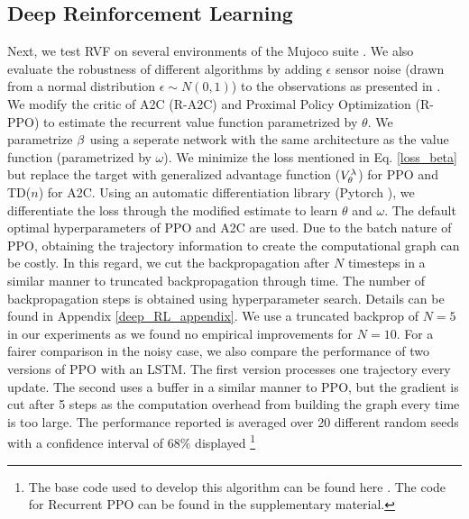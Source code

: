 \subsection{Deep Reinforcement Learning}
Next, we test RVF on several environments of the Mujoco suite \cite{todorov2012mujoco}. We also evaluate the robustness of different algorithms by adding $\epsilon$ sensor noise (drawn from a normal distribution $\epsilon \sim N(0,1)$) to the observations as presented in \cite{zhang2018dissection}.
We modify the critic of A2C \cite{wu2017scalable} (R-A2C) and Proximal Policy Optimization (R-PPO) \cite{schulman2017proximal} to estimate the recurrent value function parametrized by $\theta$. We parametrize $\beta$ using a seperate network with the same architecture as the value function (parametrized by $\omega$). We minimize the loss mentioned in Eq. \ref{loss_beta} but replace the target with generalized advantage function ($V_{\theta}^{\lambda}$) \cite{schulman2015high} for PPO and TD($n$) for A2C. Using an automatic differentiation library (Pytorch \cite{paszke2017automatic}), we differentiate the loss through the modified estimate to learn $\theta$ and $\omega$. The default optimal hyperparameters of PPO and A2C are used. Due to the batch nature of PPO, obtaining the trajectory information to create the computational graph can be costly. In this regard, we cut the backpropagation after $N$ timesteps in a similar manner to truncated backpropagation through time. The number of backpropagation steps is obtained using hyperparameter search. Details can be found in Appendix \ref{deep_RL_appendix}. We use a truncated backprop of $N=5$ in our experiments as we found no empirical improvements for $N=10$. For a fairer comparison in the noisy case, we also compare the performance of two versions of PPO with an LSTM. The first version processes one trajectory every update. The second uses a buffer in a similar manner to PPO, but the gradient is cut after 5 steps as the computation overhead from building the graph every time is too large. The performance reported is averaged over 20 different random seeds with a confidence interval of $68\%$ displayed \footnote{The base code used to develop this algorithm can be found here \cite{pytorchrl}. The code for Recurrent PPO can be found in the supplementary material.}
